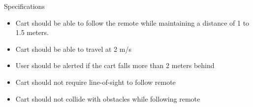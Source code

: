 \documentclass{beamer}
\begin{document}


\begin{frame}

  \begin{block}{Specifications}
    \begin{itemize}
      \item Cart should be able to follow the remote while maintaining a distance of 1 to 1.5 meters.
      \item Cart should be able to travel at 2 m/s
      \item User should be alerted if the cart falls more than 2 meters behind
      \item Cart should not require line-of-sight to follow remote
      \item Cart should not collide with obstacles while following remote
    \end{itemize}
  \end{block}
  
\end{frame}




\end{document}
